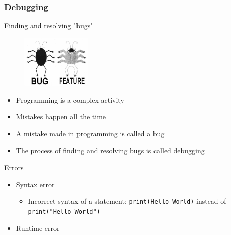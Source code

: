 \documentclass[10pt, a4paper]{beamer} %
\begin{document}
\begin{frame}[c,allowframebreaks]\frametitle{Debugging}
\begin{block}{Finding and resolving "bugs"}
\begin{figure}
    \centering
    \includegraphics[width=0.3\textwidth]{pics/bugvsfeature.jpg}
\end{figure}
\begin{itemize}
\item Programming is a complex activity
\item Mistakes happen all the time
\item A mistake made in programming is called a bug
\item The process of finding and resolving bugs is called debugging
\end{itemize}
\end{block}

\begin{block}{Errors}
    \begin{itemize}
        \item Syntax error
        \begin{itemize}
            \item Incorrect syntax of a statement: \lstinline!print(Hello World)! instead of \lstinline!print("Hello World")!
        \end{itemize}
        \item Runtime error
    

\end{itemize}
\end{block}
\end{frame}
\end{document}
